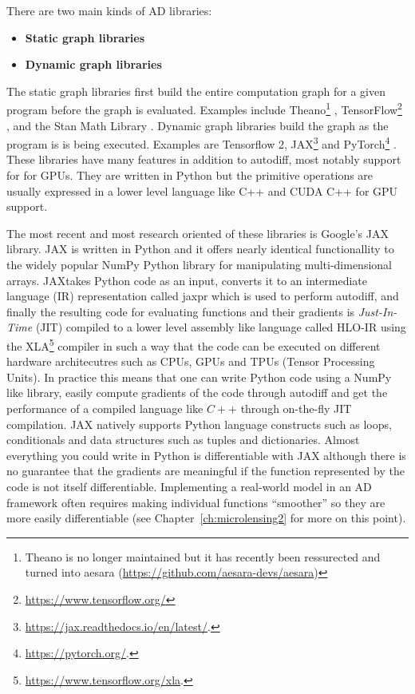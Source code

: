 \documentclass[12pt,dvipsnames]{report}
\begin{document}
There are two main kinds of AD libraries:
\begin{itemize}
    \item \textbf{Static graph libraries} 
    \item \textbf{Dynamic graph libraries}
\end{itemize}
The static graph libraries first build the entire computation graph for a given program before 
the graph is evaluated. Examples include \textsf{Theano}\footnote{Theano is no longer 
maintained but it has recently been ressurected and turned into \textsf{aesara} 
(\url{https://github.com/aesara-devs/aesara})} \citep{arXiv:1605.02688}, 
\textsf{TensorFlow}\footnote{\url{https://www.tensorflow.org/}} \citep{arXiv:1603.04467}, 
and the \textsf{Stan Math Library} \citep{arXiv:1509.07164}.
Dynamic graph libraries build the graph as the program is is being executed. Examples are 
\textsf{Tensorflow 2}, \textsf{JAX}\footnote{\url{https://jax.readthedocs.io/en/latest/}.} 
\citep{jax2018github} and \textsf{PyTorch}\footnote{\url{https://pytorch.org/}.} \citep{pytorch}.
These libraries have many features in addition to autodiff, most notably support for
for GPUs. They are written in Python but the primitive operations are usually 
expressed in a lower level language like \textsf{C++} and \textsf{CUDA C++} 
for GPU support. 

The most recent and most research oriented of these libraries is Google's \textsf{JAX} 
library.
\textsf{JAX} is written in \textsf{Python} and it offers nearly identical functionallity 
to the widely popular \textsf{NumPy} \textsf{Python} library for manipulating 
multi-dimensional arrays. \textsf{JAX}takes Python code as an input, converts it 
to an intermediate language (IR) representation called \textsf{jaxpr} which is 
used to perform autodiff, and finally the resulting code for evaluating functions 
and their gradients is \textsl{Just-In-Time} (JIT) compiled to a lower level 
assembly like language called \textsf{HLO-IR} using the 
\textsf{XLA}\footnote{\url{https://www.tensorflow.org/xla}.} compiler in such a way 
that the code can be executed on different hardware architecutres such  as 
CPUs, GPUs and TPUs (Tensor Processing Units).
In practice this means that one can write \textsf{Python} code using a \textsf{NumPy} 
like library, easily compute gradients of the code through autodiff and get 
the performance of a compiled language like $C++$ through on-the-fly JIT 
compilation. \textsf{JAX} natively supports \textsf{Python} language constructs such 
as loops, conditionals and data structures such as tuples and dictionaries.
Almost everything you could write in \textsf{Python} is differentiable with 
\textsf{JAX} although there is no guarantee that the gradients are meaningful 
if the function represented by the code is not itself differentiable.
Implementing a real-world model in an AD framework often requires making individual 
functions ``smoother'' so they are more easily differentiable (see 
Chapter~\ref{ch:microlensing2} for more on this point).
\end{document}
